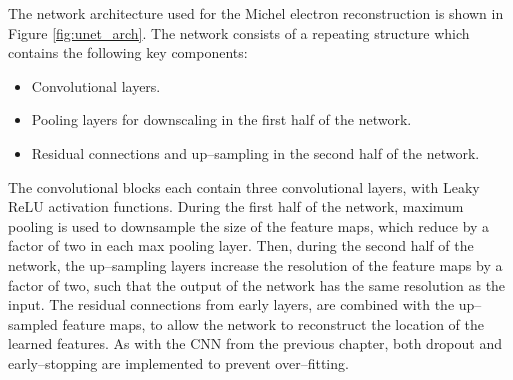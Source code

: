 The network architecture used for the Michel electron reconstruction is shown in
Figure \ref{fig:unet_arch}. The network consists of a repeating structure which
contains the following key components:
\begin{itemize}
	\item Convolutional layers.
	\item Pooling layers for downscaling in the first half of the network.
	\item Residual connections and up--sampling in the second half of the network.
\end{itemize}
The convolutional blocks each contain three convolutional layers, with Leaky 
ReLU activation functions. During the first half of the network, maximum pooling
is used to downsample the size of the feature maps, which reduce by a factor of
two in each max pooling layer. Then, during the second half of the network, the
up--sampling layers increase the resolution of the feature maps by a factor of
two, such that the output of the network has the same resolution as the 
input.  The residual connections from early layers, are combined with the
up--sampled feature maps, to allow the network to reconstruct the location of 
the learned features. As with the CNN from the previous chapter, both dropout 
and early--stopping are implemented to prevent over--fitting.
